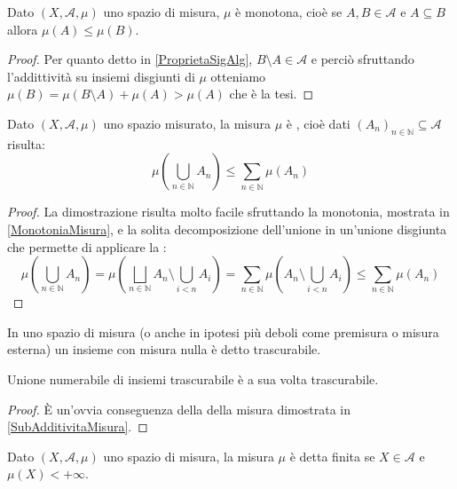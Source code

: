 \begin{remark}\label{MonotoniaMisura}
	Dato $(X,\mathcal A,\mu)$ uno spazio di misura, $\mu$ è monotona, cioè se $A,B\in\mathcal A$ e $A\subseteq B$ allora $\mu(A)\le \mu(B)$.
\end{remark}
\begin{proof}
	Per quanto detto in \cref{ProprietaSigAlg}, $B\setminus A\in\mathcal A$ e perciò sfruttando l'addittività su insiemi disgiunti di $\mu$ otteniamo $\mu(B)=\mu(B\setminus A)+\mu(A)>\mu(A)$ che è la tesi.
\end{proof}
\begin{remark}\label{SubAdditivitaMisura}
	Dato $(X,\mathcal A,\mu)$ uno spazio misurato, la misura $\mu$ è \sigsubadd{}, cioè dati $(A_n)_{n\in\mathbb N}\subseteq\mathcal A$ risulta:
	\begin{equation*}
		\mu\left(\bigcup_{n\in\mathbb N} A_n \right)\le \sum_{n\in\mathbb N}\mu(A_n)
	\end{equation*}
\end{remark}
\begin{proof}
	La dimostrazione risulta molto facile sfruttando la monotonia, mostrata in \cref{MonotoniaMisura}, e la solita decomposizione dell'unione in un'unione disgiunta che permette di applicare la \sigadd[ità]:
	\begin{equation*}
		\mu\left(\bigcup_{n\in\mathbb N} A_n \right)=\mu\left(\bigsqcup_{n\in\mathbb N} A_n\setminus\bigcup_{i<n}A_i \right)=
		\sum_{n\in\mathbb N}\mu\left(A_n\setminus\bigcup_{i<n}A_i\right)\le \sum_{n\in\mathbb N}\mu(A_n)
	\end{equation*}
\end{proof}



\begin{definition}\label{TrascurabiliMisura}
	In uno spazio di misura (o anche in ipotesi più deboli come premisura o misura esterna) un insieme con misura nulla è detto trascurabile.
\end{definition}
\begin{remark}\label{UnioneTrascurabili}
	Unione numerabile di insiemi trascurabile è a sua volta trascurabile.
\end{remark}
\begin{proof}
	È un'ovvia conseguenza della \sigsubadd[ità] della misura dimostrata in \cref{SubAdditivitaMisura}.
\end{proof}




\begin{definition}\label{FinitezzaMisura}
	Dato $(X,\mathcal A,\mu)$ uno spazio di misura, la misura $\mu$ è detta finita se $X\in\mathcal{A}$ e $\mu(X)<+\infty$.
\end{definition}

